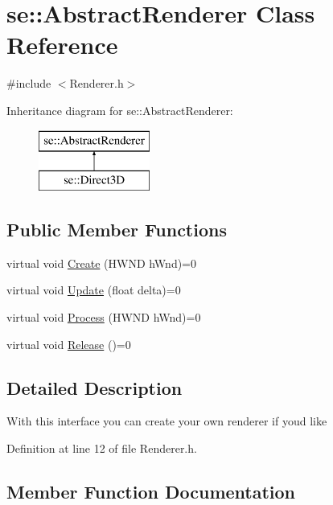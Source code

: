 \hypertarget{classse_1_1_abstract_renderer}{}\section{se\+:\+:Abstract\+Renderer Class Reference}
\label{classse_1_1_abstract_renderer}


{\ttfamily \#include $<$Renderer.\+h$>$}

Inheritance diagram for se\+:\+:Abstract\+Renderer\+:\begin{figure}[H]
\begin{center}
\leavevmode
\includegraphics[height=2.000000cm]{classse_1_1_abstract_renderer}
\end{center}
\end{figure}
\subsection*{Public Member Functions}
\begin{DoxyCompactItemize}
\item 
virtual void \mbox{\hyperlink{classse_1_1_abstract_renderer_afdfce8b91028448c17ce27550827f192}{Create}} (H\+W\+ND h\+Wnd)=0
\item 
virtual void \mbox{\hyperlink{classse_1_1_abstract_renderer_aae49e7417663d6a5aca34a2bb37b4b28}{Update}} (float delta)=0
\item 
virtual void \mbox{\hyperlink{classse_1_1_abstract_renderer_a302d3f6e465ad7df40c317068a5420fc}{Process}} (H\+W\+ND h\+Wnd)=0
\item 
virtual void \mbox{\hyperlink{classse_1_1_abstract_renderer_a98e35b7db62827580573185ed91b25bb}{Release}} ()=0
\end{DoxyCompactItemize}


\subsection{Detailed Description}
With this interface you can create your own renderer if you\textquotesingle{}d like 

Definition at line 12 of file Renderer.\+h.



\subsection{Member Function Documentation}
\mbox{\label{classse_1_1_abstract_renderer_afdfce8b91028448c17ce27550827f192}} 
